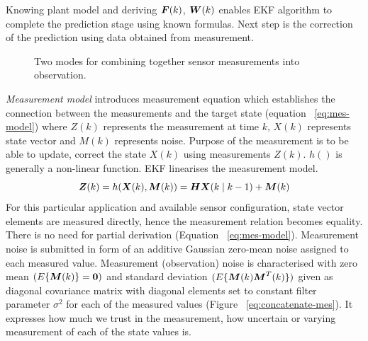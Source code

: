 Knowing plant model and deriving $\boldsymbol{F}(k)$, $\boldsymbol{W}(k)$ enables EKF algorithm to complete the prediction stage using known formulas. Next step is the correction of the prediction using data obtained from measurement.
\begin{figure}%
  \begin{center}
  \end{center}
  \caption{Two modes for combining together sensor measurements into observation.}
  \vspace{-10pt}
  \label{fig:ekf-modes}
\end{figure}
\textit{Measurement model} introduces measurement equation which establishes the connection between the measurements and the target state (equation ~\ref{eq:mes-model}) where $Z(k)$ represents the measurement at time $k$, $X(k)$ represents state vector and $M(k)$ represents noise. Purpose of the measurement is to be able to update, correct the state $X(k)$ using measurements $Z(k)$. $h()$ is generally a non-linear function. EKF linearises the measurement model.
\begin{equation}
\boldsymbol{Z}(k) = h(\boldsymbol{X}(k), \boldsymbol{M}(k)) = \boldsymbol{H} \boldsymbol{X}(k \mid k-1)  + \boldsymbol{M}(k)
\label{eq:mes-model}
\end{equation}
For this particular application and available sensor configuration, state vector elements are measured directly, hence the measurement relation becomes equality. There is no need for partial derivation (Equation ~\ref{eq:mes-model}). Measurement noise is submitted in form of an additive Gaussian zero-mean noise assigned to each measured value. Measurement (observation) noise is characterised with zero mean $(E \lbrace \boldsymbol{M}(k) \rbrace = \boldsymbol{0})$ and standard deviation $(E \lbrace \boldsymbol{M}(k) \boldsymbol{M}^{T}(k) \rbrace)$ given as diagonal covariance matrix with diagonal elements set to constant filter parameter $\sigma^{2}$ for each of the measured values (Figure ~\ref{eq:concatenate-mes}). It expresses how much we trust in the measurement, how uncertain or varying measurement of each of the state values is. 

